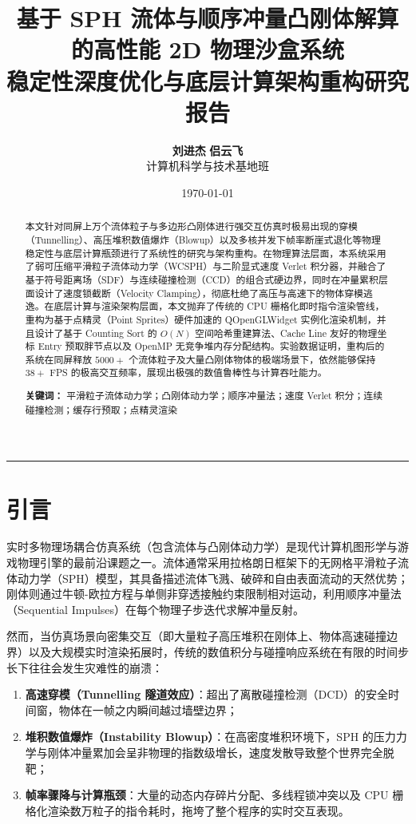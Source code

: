 \documentclass[11pt,a4paper]{article}
\title{\vspace{-1.5cm}\textbf{\Large 基于 SPH 流体与顺序冲量凸刚体解算的高性能 2D 物理沙盒系统}\\ \large 稳定性深度优化与底层计算架构重构研究报告}
\author{\textbf{刘进杰} \quad \textbf{侣云飞} \\ \small 计算机科学与技术基地班}
\date{\today}
\begin{document}
\maketitle

\begin{abstract}
本文针对同屏上万个流体粒子与多边形凸刚体进行强交互仿真时极易出现的穿模（Tunnelling）、高压堆积数值爆炸（Blowup）以及多核并发下帧率断崖式退化等物理稳定性与底层计算瓶颈进行了系统性的研究与架构重构。在物理算法层面，本系统采用了弱可压缩平滑粒子流体动力学（WCSPH）与二阶显式速度 Verlet 积分器，并融合了基于符号距离场（SDF）与连续碰撞检测（CCD）的组合式硬边界，同时在冲量累积层面设计了速度锁截断（Velocity Clamping），彻底杜绝了高压与高速下的物体穿模逃逸。在底层计算与渲染架构层面，本文抛弃了传统的 CPU 栅格化即时指令渲染管线，重构为基于点精灵（Point Sprites）硬件加速的 QOpenGLWidget 实例化渲染机制，并且设计了基于 Counting Sort 的 $O(N)$ 空间哈希重建算法、Cache Line 友好的物理坐标 Entry 预取胖节点以及 OpenMP 无竞争堆内存分配结构。实验数据证明，重构后的系统在同屏释放 $5000+$ 个流体粒子及大量凸刚体物体的极端场景下，依然能够保持 $38+$ FPS 的极高交互频率，展现出极强的数值鲁棒性与计算吞吐能力。

\textbf{关键词：} 平滑粒子流体动力学；凸刚体动力学；顺序冲量法；速度 Verlet 积分；连续碰撞检测；缓存行预取；点精灵渲染
\end{abstract}

\noindent\rule{\textwidth}{0.5pt}

\section{引言}
实时多物理场耦合仿真系统（包含流体与凸刚体动力学）是现代计算机图形学与游戏物理引擎的最前沿课题之一。流体通常采用拉格朗日框架下的无网格平滑粒子流体动力学（SPH）模型，其具备描述流体飞溅、破碎和自由表面流动的天然优势；刚体则通过牛顿-欧拉方程与单侧非穿透接触约束限制相对运动，利用顺序冲量法（Sequential Impulses）在每个物理子步迭代求解冲量反射。

然而，当仿真场景向密集交互（即大量粒子高压堆积在刚体上、物体高速碰撞边界）以及大规模实时渲染拓展时，传统的数值积分与碰撞响应系统在有限的时间步长下往往会发生灾难性的崩溃：
\begin{enumerate}
    \item \textbf{高速穿模（Tunnelling 隧道效应）}：超出了离散碰撞检测（DCD）的安全时间窗，物体在一帧之内瞬间越过墙壁边界；
    \item \textbf{堆积数值爆炸（Instability Blowup）}：在高密度堆积环境下，SPH 的压力力学与刚体冲量累加会呈非物理的指数级增长，速度发散导致整个世界完全脱靶；
    \item \textbf{帧率骤降与计算瓶颈}：大量的动态内存碎片分配、多线程锁冲突以及 CPU 栅格化渲染数万粒子的指令耗时，拖垮了整个程序的实时交互表现。
\end{enumerate}
\end{document}
